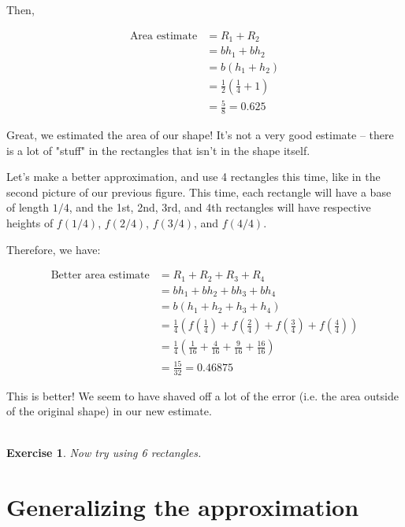 \documentclass{book}
\newtheorem{exercise}{\\ \bf Exercise}
\begin{document}
Then,  

\begin{align*}
\text{Area estimate} &= R_1 + R_2 \\
&= b h_1 + b h_2 \\
&= b (h_1 + h_2) \\
&= \frac{1}{2} \left( \frac{1}{4} + 1 \right) \\
&= \frac{5}{8} = 0.625
\end{align*}

Great, we estimated the area of our shape! It's not a very good estimate -- there is a lot of "stuff" in the rectangles that isn't in the shape itself.

Let's make a better approximation, and use 4 rectangles this time, like in the second picture of our previous figure. This time, each rectangle will have a base of length $1/4$, and the 1st, 2nd, 3rd, and 4th rectangles will have respective heights of $f(1/4)$, $f(2/4)$, $f(3/4)$, and $f(4/4)$. 


Therefore, we have:  

\begin{align*}
\text{Better area estimate} &= R_1 + R_2 + R_3 + R_4 \\
&= b h_1 + b h_2 + b h_3 + b h_4 \\
&= b (h_1 + h_2 + h_3 + h_4) \\
&= \frac{1}{4} \left( f(\frac{1}{4}) + f(\frac{2}{4}) + f(\frac{3}{4}) + f(\frac{4}{4}) \right) \\
&= \frac{1}{4} \left( \frac{1}{16} + \frac{4}{16} + \frac{9}{16} + \frac{16}{16} \right) \\
&= \frac{15}{32} = 0.46875
\end{align*}


This is better! We seem to have shaved off a lot of the error (i.e. the area outside of the original shape) in our new estimate. 

\begin{exercise}
Now try using 6 rectangles.
\end{exercise}


\section{Generalizing the approximation}
\end{document}
